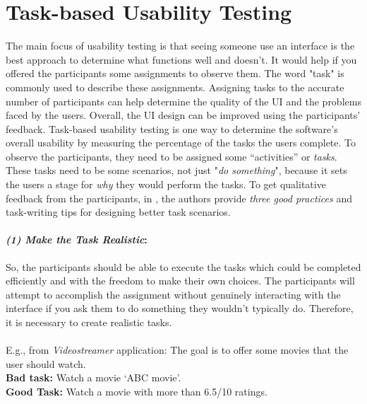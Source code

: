 \section{Task-based Usability Testing}
\label{background:section:task}
The main focus of usability testing is that seeing someone use an interface is the best approach to determine what functions well and doesn't. 
It would help if you offered the participants some assignments to observe them. 
The word "task" is commonly used to describe these assignments.
Assigning tasks to the accurate number of participants can help determine the quality of the UI and the problems faced by the users. 
Overall, the UI design can be improved using the participants' feedback. 
Task-based usability testing is one way to determine the software's overall usability \cite{article:usability:doesburg} by measuring the percentage of the tasks the users complete.
To observe the participants, they need to be assigned some ``activities'' or \textit{tasks}. 
These tasks need to be some scenarios, not just "\textit{do something}", because it sets the users a stage for \textit{why} they would perform the tasks. 
To get qualitative feedback from the participants, in \cite{misc:usability:tasks}, the authors provide \textit{three good practices} and task-writing tips for designing better task scenarios.

\paragraph{\textit{(1) Make the Task Realistic}:}
So, the participants should be able to execute the tasks which could be completed efficiently and with the freedom to make their own choices.
The participants will attempt to accomplish the assignment without genuinely interacting with the interface if you ask them to do something they wouldn't typically do. 
Therefore, it is necessary to create realistic tasks. \\\\
E.g., from \textit{Videostreamer} application: The goal is to offer some movies that the user should watch. \\
\textbf{Bad task: } Watch a movie `ABC movie'.\\
\textbf{Good Task: } Watch a movie with more than 6.5/10 ratings. \\

